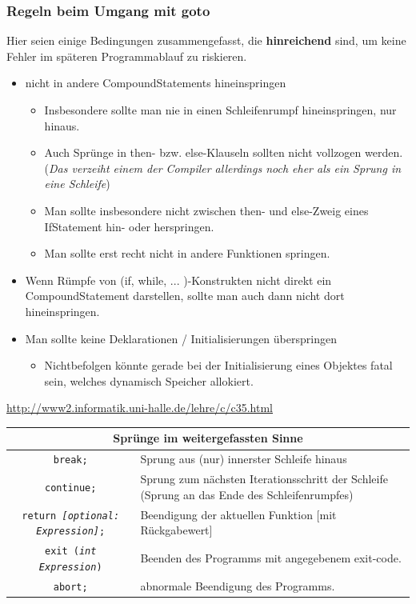 \documentclass[a4paper]{report}
\begin{document}
\subsubsection{Regeln beim Umgang mit goto}
Hier seien einige Bedingungen zusammengefasst, die \textbf{hinreichend} sind, um keine Fehler im späteren Programmablauf zu riskieren.
\begin{itemize}
	\item nicht in andere CompoundStatements hineinspringen
	\begin{itemize}
		\item  Insbesondere sollte man nie in einen Schleifenrumpf hineinspringen, nur hinaus.
		\item  Auch Sprünge in then- bzw. else-Klauseln sollten nicht vollzogen werden. (\textit{Das verzeiht einem der Compiler allerdings noch eher als ein Sprung in eine Schleife})
		\item  Man sollte insbesondere nicht zwischen then- und else-Zweig eines IfStatement hin- oder herspringen.
		\item  Man sollte erst recht nicht in andere Funktionen springen.
	\end{itemize}
	\item Wenn Rümpfe von (if, while, ... )-Konstrukten nicht direkt ein CompoundStatement darstellen, sollte man auch dann nicht dort hineinspringen.
	\item Man sollte keine Deklarationen / Initialisierungen überspringen
	\begin{itemize}
		\item Nichtbefolgen könnte gerade bei der Initialisierung eines Objektes fatal sein, welches dynamisch Speicher allokiert.
	\end{itemize}
\end{itemize}

\url{http://www2.informatik.uni-halle.de/lehre/c/c35.html}
\begin{center}
\begin{tabular}{|c|p{10cm}|} \hline
	\multicolumn{2}{|c|}{\textbf{Sprünge im weitergefassten Sinne}} \\ \hline
	\texttt{break;} & Sprung aus (nur) innerster Schleife hinaus \\
	\texttt{continue;} & Sprung zum nächsten Iterationsschritt der Schleife (Sprung an das Ende des Schleifenrumpfes) \\
	\texttt{return \textit{[{\small optional:} Expression]};} & Beendigung der aktuellen Funktion [mit Rückgabewert] \\
	\texttt{exit (\textit{int Expression})} & Beenden des Programms mit angegebenem exit-code. \\
	\texttt{abort;} & abnormale Beendigung des Programms. \\ \hline
\end{tabular}
\end{center}
\end{document}
